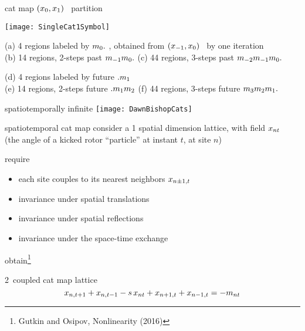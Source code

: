 \begin{frame}{cat map $(x_{0},x_{1})$  \statesp\ partition}
\begin{center}
	\texttt{[image: SingleCat1Symbol]}
\end{center}

{\scriptsize
(a) 4 regions labeled by ${m_{0}}.$ , obtained from
$(x_{-1},x_{0})$ \statesp\ by one iteration
\\
(b) 14 regions, 2-steps past ${m_{-1}}{m_{0}}.$
(c) 44 regions, 3-steps past ${m_{-2}}{m_{-1}}{m_{0}}.$

\medskip

(d) 4 regions labeled by future $.{m_{1}}$
\\
(e) 14 regions, 2-steps  future $.{m_{1}}{m_{2}}$
(f) 44 regions, 3-steps future {\brick} ${m_{3}}{m_{2}}{m_{1}}.$
}
\end{frame}

\begin{frame}{spatiotemporally infinite \catlatt}
\hfill\texttt{[image: DawnBishopCats]}
\end{frame}


\begin{frame}{spatiotemporal cat map}
consider
a 1 spatial dimension lattice, with field
$x_{nt}$ \\
(the angle of a kicked
rotor ``particle'' at instant $t$, at site $n$)
\begin{block}{require}
\begin{itemize}
\item  each site couples to
its nearest neighbors $x_{n\pm1,t}$
\item  invariance under
spatial translations
\item  invariance under spatial reflections
\item  invariance under the space-time exchange
\end{itemize}
\end{block}

\bigskip

obtain\footnote{Gutkin and Osipov, Nonlinearity (2016)}
\begin{block}{2\dmn\ coupled cat map lattice}
\[
x_{n,t+1} + x_{n,t-1} - s \, x_{n t} + x_{n+1,t} + x_{n-1, t}
     =-{m_{n t}}
\] %
\end{block}
\end{frame}

